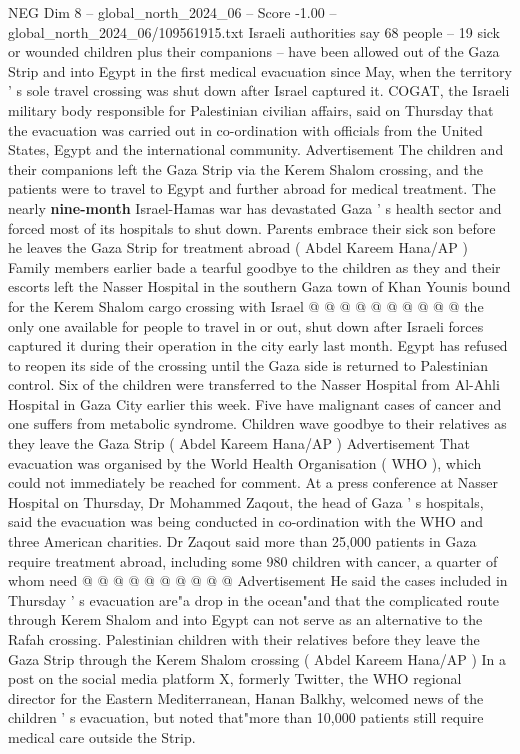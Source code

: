 \begin{textsample}{NEG Dim 8 – global\_north\_2024\_06 – Score -1.00 – global\_north\_2024\_06/109561915.txt}  \label{ex:f8_neg_195}
Israeli authorities say 68 people -- 19 sick or wounded children plus their companions -- have been allowed out of the Gaza Strip and into Egypt in the first medical evacuation since May, when the territory ' s sole travel crossing was shut down after Israel captured it.
COGAT, the Israeli military body responsible for Palestinian civilian affairs, said on Thursday that the evacuation was carried out in co-ordination with officials from the United States, Egypt and the international community.
Advertisement The children and their companions left the Gaza Strip via the Kerem Shalom crossing, and the patients were to travel to Egypt and further abroad for medical treatment.
The nearly \textbf{nine-month} Israel-Hamas war has devastated Gaza ' s health sector and forced most of its hospitals to shut down.
Parents embrace their sick son before he leaves the Gaza Strip for treatment abroad ( Abdel Kareem Hana/AP ) Family members earlier bade a tearful goodbye to the children as they and their escorts left the Nasser Hospital in the southern Gaza town of Khan Younis bound for the Kerem Shalom cargo crossing with Israel @ @ @ @ @ @ @ @ @ @ the only one available for people to travel in or out, shut down after Israeli forces captured it during their operation in the city early last month.
Egypt has refused to reopen its side of the crossing until the Gaza side is returned to Palestinian control.
Six of the children were transferred to the Nasser Hospital from Al-Ahli Hospital in Gaza City earlier this week.
Five have malignant cases of cancer and one suffers from metabolic syndrome.
Children wave goodbye to their relatives as they leave the Gaza Strip ( Abdel Kareem Hana/AP ) Advertisement That evacuation was organised by the World Health Organisation ( WHO ), which could not immediately be reached for comment.
At a press conference at Nasser Hospital on Thursday, Dr Mohammed Zaqout, the head of Gaza ' s hospitals, said the evacuation was being conducted in co-ordination with the WHO and three American charities.
Dr Zaqout said more than 25,000 patients in Gaza require treatment abroad, including some 980 children with cancer, a quarter of whom need @ @ @ @ @ @ @ @ @ @ Advertisement He said the cases included in Thursday ' s evacuation are"a drop in the ocean"and that the complicated route through Kerem Shalom and into Egypt can not serve as an alternative to the Rafah crossing.
Palestinian children with their relatives before they leave the Gaza Strip through the Kerem Shalom crossing ( Abdel Kareem Hana/AP ) In a post on the social media platform X, formerly Twitter, the WHO regional director for the Eastern Mediterranean, Hanan Balkhy, welcomed news of the children ' s evacuation, but noted that"more than 10,000 patients still require medical care outside the Strip.

\end{textsample}
